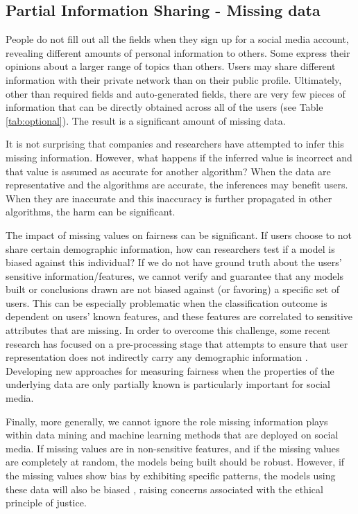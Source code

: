 \documentclass[11pt]{article} %
\begin{document}
\subsection{Partial Information Sharing - Missing data}
People do not fill out all the fields when they sign up for a social media account, revealing different amounts of personal information to others.  Some express their opinions about a larger range of topics than others. Users may share different information with their private network than on their public profile. Ultimately, other than required fields and auto-generated fields, there are very few pieces of information that can be directly obtained across all of the users (see Table \ref{tab:optional}). The result is a significant amount of missing data. 

It is not surprising that companies and researchers have attempted to infer this missing information. However, what happens if the inferred value is incorrect and that value is assumed as accurate for another algorithm? When the data are representative and the algorithms are accurate, the inferences may benefit users. When they are inaccurate and this inaccuracy is further propagated in other algorithms, the harm can be significant.  

The impact of missing values on fairness can be significant. If users choose to not share certain demographic information, how can researchers test if a model is biased against this individual? If we do not have ground truth about the users' sensitive information/features, we cannot verify and guarantee that any models built or conclusions drawn are not biased against (or favoring) a specific set of users. This can be especially problematic when the classification outcome is dependent on users' known features, and these features are correlated to sensitive attributes that are missing. In order to overcome this challenge, some recent research has focused on a pre-processing stage that attempts to ensure that user representation does not indirectly carry any demographic information \cite{10.1177/2053951717743530,Kamiran2011DataPT}. Developing new approaches for measuring fairness when the properties of the underlying data are only partially known is particularly important for social media.

Finally, more generally, we cannot ignore the role missing information plays within data mining and machine learning methods that are deployed on social media.  If missing values are in non-sensitive features, and if the missing values are completely at random, the models being built should be robust. However, if the missing values show bias by exhibiting specific patterns, the models using these data will also be biased \cite{little2019statistical}, raising concerns associated with the ethical principle of justice. 
\end{document}
